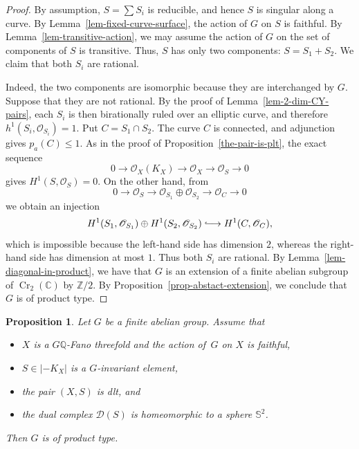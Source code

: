 \documentclass[11pt]{amsart}
\numberwithin{equation}{section}
\newtheorem{proposition}[thm]{Proposition}
\theoremstyle{definition}
\theoremstyle{remark}
\newcommand{\OOO}{\mathscr{O}}
\newcommand{\lra}{\longrightarrow}
\DeclareMathOperator{\Cr}{Cr}
\begin{document}
\begin{proof}
By assumption, $S=\sum S_i$ is reducible, and hence $S$ is singular along a curve. 
By Lemma~\ref{lem-fixed-curve-surface}, the action of $G$ on $S$ is faithful. 
By Lemma~\ref{lem-transitive-action}, we may assume the action of $G$ on the set of components of $S$ is transitive. 
Thus, $S$ has only two components: $S=S_1+S_2$. We claim that both $S_i$ are rational. 

Indeed, the two components are isomorphic because they are
interchanged by $G$. Suppose that they are not rational. By the proof
of Lemma~\ref{lem-2-dim-CY-pairs}, each $S_i$ is then birationally
ruled over an elliptic curve, and therefore
$
h^1(S_i,\OOO_{S_i})=1.
$
Put $C=S_1\cap S_2$. The curve $C$ is connected, and adjunction gives
$p_a(C)\leq1$. As in the proof of
Proposition~\ref{the-pair-is-plt}, the exact sequence
\[
0\lra\OOO_X(K_X)\lra\OOO_X\lra\OOO_S\lra0
\]
gives $H^1(S,\OOO_S)=0$. On the other hand, from
\begin{equation}
\label{eq-normalization-conductor}
0\lra\OOO_S\lra\OOO_{S_1}\oplus\OOO_{S_2}
\lra\OOO_C\lra0
\end{equation}
we obtain an injection
\[
H^1(S_1,\OOO_{S_1})\oplus H^1(S_2,\OOO_{S_2})
\lhook\joinrel\longrightarrow H^1(C,\OOO_C),
\]
which is impossible because the left-hand side has dimension $2$, whereas the
right-hand side has dimension at most $1$. Thus both $S_i$ are rational.
\color{black}
By Lemma~\ref{lem-diagonal-in-product}, we have that $G$ is an extension of a finite abelian subgroup of $\Cr_2(\mathbb{C})$ by $\mathbb{Z}/2$. By Proposition~\ref{prop-abstact-extension}, we conclude that $G$ is of product type. 
\end{proof}

\begin{proposition}
\label{prop-reducible-2}
Let $G$ be a finite abelian group. 
Assume that 
\begin{itemize}
\item
$X$ is a $G\mathbb{Q}$-Fano threefold and the action of\, $G$ on $X$ is faithful,
\item 
$S\in |-K_X|$ is a $G$-invariant element,
\item 
the pair $(X, S)$ is dlt, and
\item
the dual complex $\mathcal{D}(S)$ is homeomorphic to a sphere $\mathbb{S}^2$. 
\end{itemize}
Then $G$ is of product type.
\end{proposition}
\end{document}
